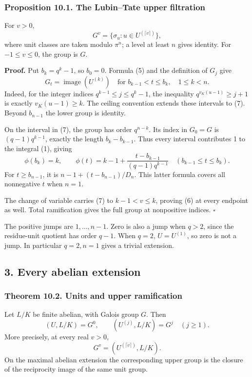 \documentclass[11pt,a4paper]{article}
\begin{document}
\subsubsection{Proposition 10.1. The Lubin--Tate upper
filtration}\label{proposition-10.1.-the-lubintate-upper-filtration}

For \(v>0\), \[
G^v=\{\sigma_u:u\in U^{(\lceil v\rceil)}\},
\tag{6}
\] where unit classes are taken modulo \(\pi^n\); a level at least \(n\)
gives identity. For \(-1\leq v\leq0\), the group is \(G\).

\textbf{Proof.} Put \(b_k=q^k-1\), so \(b_0=0\). Formula (5) and the
definition of \(G_j\) give \[
G_t=\operatorname{image}(U^{(k)})
\quad\text{for }b_{k-1}<t\leq b_k,\quad 1\leq k<n.
\tag{7}
\] Indeed, for the integer indices \(q^{k-1}\leq j\leq q^k-1\), the
inequality \(q^{v_K(u-1)}\geq j+1\) is exactly \(v_K(u-1)\geq k\). The
ceiling convention extends these intervals to (7). Beyond \(b_{n-1}\)
the lower group is identity.

On the interval in (7), the group has order \(q^{n-k}\). Its index in
\(G_0=G\) is \((q-1)q^{k-1}\), exactly the length \(b_k-b_{k-1}\). Thus
every interval contributes 1 to the integral (1), giving \[
\phi(b_k)=k,\qquad
\phi(t)=k-1+\frac{t-b_{k-1}}{(q-1)q^{k-1}}
\quad(b_{k-1}\leq t\leq b_k).
\tag{8}
\] For \(t\geq b_{n-1}\), it is \(n-1+(t-b_{n-1})/D_n\). This latter
formula covers all nonnegative \(t\) when \(n=1\).

The change of variable carries (7) to \(k-1<v\leq k\), proving (6) at
every endpoint as well. Total ramification gives the full group at
nonpositive indices. \(\square\)

The positive jumps are \(1,\ldots,n-1\). Zero is also a jump when
\(q>2\), since the residue-unit quotient has order \(q-1\). When
\(q=2\), \(U=U^{(1)}\), so zero is not a jump. In particular \(q=2,n=1\)
gives a trivial extension.

\subsection{3. Every abelian extension}\label{every-abelian-extension}

\subsubsection{Theorem 10.2. Units and upper
ramification}\label{theorem-10.2.-units-and-upper-ramification}

Let \(L/K\) be finite abelian, with Galois group \(G\). Then \[
(U,L/K)=G^0,\qquad
(U^{(j)},L/K)=G^j\quad(j\geq1).
\tag{9}
\] More precisely, at every real \(v>0\), \[
G^v=(U^{(\lceil v\rceil)},L/K).
\tag{10}
\] On the maximal abelian extension the corresponding upper group is the
closure of the reciprocity image of the same unit group.
\end{document}
